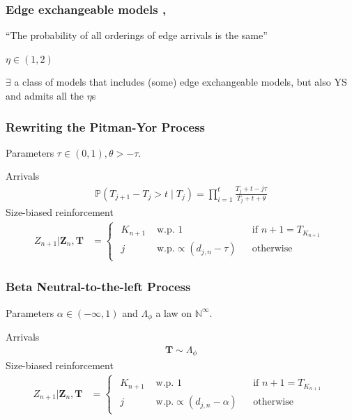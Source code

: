 \documentclass[final,hyperref={pdfpagelabels=false},noamsthm]{beamer}
\def\bbP{\mathbb{P}}
\newcommand{\ee}{Z} %
\newcommand{\bfee}{\mathbf{\ee}}
\newcommand{\bfT}{\mathbf{T}}
\begin{document}
\begin{frame}
	\frametitle{Edge exchangeable models \cite{cai2016}, \cite{CraneDempsey2017}}
	``The probability of all orderings of edge arrivals is the same''
	
	\vspace{20pt}
	
	$\eta \in (1,2)$
	
	$\exists$ a class of models that includes (some) edge exchangeable models, but also YS and admits all the $\eta$s
	
\end{frame}

\begin{frame}
	\frametitle{Rewriting the Pitman-Yor Process}
	Parameters $\tau \in (0, 1), \theta > -\tau$.
	\vspace{15pt}
	
	Arrivals
	\begin{align*}
	\bbP(T_{j+1} - T_j > t \mid T_j) = \prod_{i=1}^{t} \frac{T_j + t - j \tau}{T_j + t + \theta}
	\end{align*}
	Size-biased reinforcement
	\begin{align*} 
	\ee_{n+1} | \bfee_{n}, \bfT &= \begin{cases}\begin{aligned}
	K_{n+1} & \text{ w.p. } 1 && \text{if } n+1 = T_{K_{n+1}} \\
	j &\text{ w.p.} \propto (d_{j,n} - \tau) && \text{otherwise} 
	\end{aligned}\end{cases}
	\end{align*}
\end{frame}

\begin{frame}
	\frametitle{Beta Neutral-to-the-left Process \cite{Bloem2017}}
	Parameters $\alpha \in (-\infty, 1)$ and $\Lambda_\phi$ a law on $\mathbb{N}^\infty$.
	\vspace{15pt}
	
	Arrivals
	\begin{align*}
	\bfT \sim \Lambda_\phi
	\end{align*}
	Size-biased reinforcement
	\begin{align*} 
	\ee_{n+1} | \bfee_{n}, \bfT &= \begin{cases}\begin{aligned}
	K_{n+1} & \text{ w.p. } 1 && \text{if } n+1 = T_{K_{n+1}} \\
	j &\text{ w.p.} \propto (d_{j,n} - \alpha) && \text{otherwise} 
	\end{aligned}\end{cases}
	\label{eq:bntl}
	\end{align*}
\end{frame}
\end{document}
